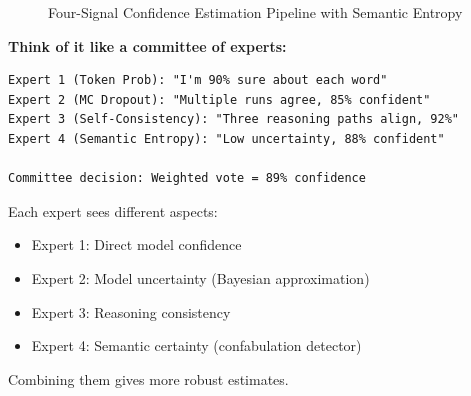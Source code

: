 \documentclass[12pt,a4paper]{article}
\theoremstyle{definition}
\begin{document}
\begin{figure}[htbp]
\caption{Four-Signal Confidence Estimation Pipeline with Semantic Entropy}
\label{fig:confidence}
\end{figure}

\begin{intuitionbox}
\textbf{Think of it like a committee of experts:}

\begin{verbatim}
Expert 1 (Token Prob): "I'm 90% sure about each word"
Expert 2 (MC Dropout): "Multiple runs agree, 85% confident"
Expert 3 (Self-Consistency): "Three reasoning paths align, 92%"
Expert 4 (Semantic Entropy): "Low uncertainty, 88% confident"

Committee decision: Weighted vote = 89% confidence
\end{verbatim}

Each expert sees different aspects:
\begin{itemize}
    \item Expert 1: Direct model confidence
    \item Expert 2: Model uncertainty (Bayesian approximation)
    \item Expert 3: Reasoning consistency
    \item Expert 4: Semantic certainty (confabulation detector)
\end{itemize}

Combining them gives more robust estimates.
\end{intuitionbox}
\end{document}
